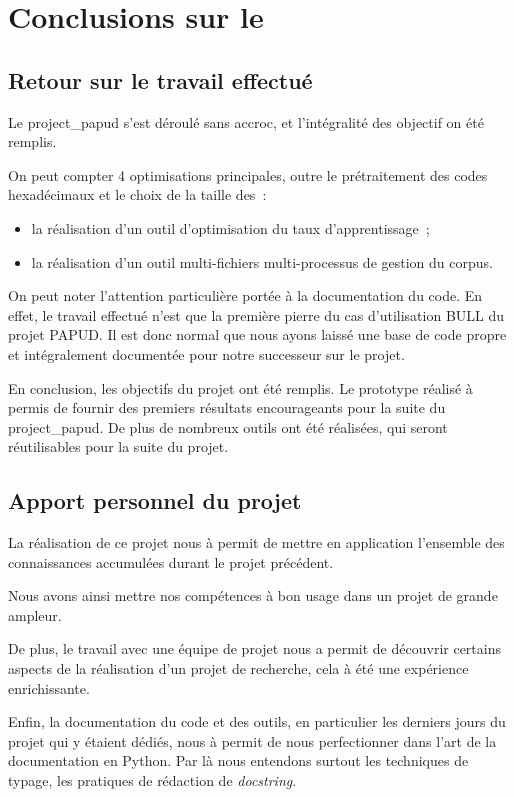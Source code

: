 \chapter{Conclusions sur le }

\section{Retour sur le travail effectué}
Le \gls{project_papud} s'est déroulé sans accroc, et l'intégralité des objectif on été remplis.

On peut compter 4 optimisations principales, outre le prétraitement des codes hexadécimaux et le choix de la taille des~:
\begin{itemize}
	\item la réalisation d'un outil d'optimisation du taux d'apprentissage~;
	\item la réalisation d'un outil multi-fichiers multi-processus de gestion du corpus.
\end{itemize} %

On peut noter l'attention particulière portée à la documentation du code.
En effet, le travail effectué n'est que la première pierre du cas d'utilisation BULL du projet PAPUD.
Il est donc normal que nous ayons laissé une base de code propre et intégralement documentée pour notre successeur sur le projet.

En conclusion, les objectifs du projet ont été remplis. Le prototype réalisé à permis de fournir des premiers résultats encourageants pour la suite du \gls{project_papud}. De plus de nombreux outils ont été réalisées, qui seront réutilisables pour la suite du projet.

\section{Apport personnel du projet}
La réalisation de ce projet nous à permit de mettre en application l'ensemble des connaissances accumulées durant le projet précédent.

Nous avons ainsi mettre nos compétences à bon usage dans un projet de grande ampleur.

De plus, le travail avec une équipe de projet nous a permit de découvrir certains aspects de la réalisation d'un projet de recherche, cela à été une expérience enrichissante.

Enfin, la documentation du code et des outils, en particulier les derniers jours du projet qui y étaient dédiés, nous à permit de nous perfectionner dans l'art de la documentation en Python.
Par là nous entendons surtout les techniques de typage, %
les pratiques de rédaction de \textit{docstring}.

